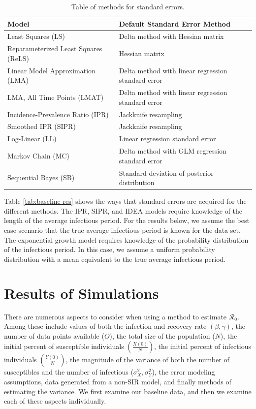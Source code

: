\documentclass[12pt]{article}
\newcommand{\rr}{\ensuremath{\mathcal{R}_0}}
\begin{document}
\begin{table}[H]
	\centering
	\begin{tabular}{@{}ll@{}}
		\toprule
		\textbf{Model} & \textbf{Default Standard Error Method} \\ \midrule
		Least Squares (LS) & Delta method with Hessian matrix\\
		Reparameterized Least Squares (ReLS) & Hessian matrix \\
		Linear Model Approximation (LMA) & Delta method with linear regression standard error \\
		LMA, All Time Points  (LMAT)& Delta method with linear regression standard error \\
		Incidence-Prevalence Ratio (IPR) & Jackknife resampling \\
		Smoothed IPR (SIPR) & Jackknife resampling \\
		Log-Linear (LL) & Linear regression standard error \\
		Markov Chain (MC) & Delta method with GLM regression standard error \\
		Sequential Bayes (SB) & Standard deviation of posterior distribution\\
		\bottomrule
	\end{tabular}
	\caption{Table of methods for standard errors.}
	\label{tab:se-methods}
\end{table}

Table \ref{tab:baseline-res} shows the ways that standard errors are acquired for the different methods. The IPR, SIPR, and IDEA models require knowledge of the length of the average infectious period. For the results below, we assume the best case scenario that the true average infectious period is known for the data set. The exponential growth model requires knowledge of the probability distribution of the infectious period. In this case, we assume a uniform probability distribution with a mean equivalent to the true average infectious period.

\section{Results of Simulations}\label{sec:results}
There are numerous aspects to consider when using a method to estimate $\rr$.  Among these include values of both the infection and recovery rate $(\beta, \gamma)$, the number of data points available ($O$), the total size of the population ($N$), the initial percent of susceptible individuals $\left (\frac{X(0)}{N}\right)$, the initial percent of infectious individuals $\left (\frac{Y(0)}{N}\right )$, the magnitude of the variance of both the number of susceptibles and the number of infectious ($\sigma_X^2, \sigma_Y^2$), the error modeling assumptions, data generated from a non-SIR model, and finally methods of estimating the variance.  We first examine our baseline data, and then we examine each of these aspects individually.
\end{document}
